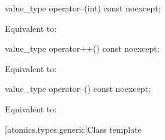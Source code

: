 %
%
\begin{itemdecl}
value_type operator--(int) const noexcept;
\end{itemdecl}

\begin{itemdescr}
\pnum
\effects
Equivalent to: 
\end{itemdescr}

%
%
\begin{itemdecl}
value_type operator++() const noexcept;
\end{itemdecl}

\begin{itemdescr}
\pnum
\effects
Equivalent to: 
\end{itemdescr}

%
%
\begin{itemdecl}
value_type operator--() const noexcept;
\end{itemdecl}

\begin{itemdescr}
\pnum
\effects
Equivalent to: 
\end{itemdescr}

[atomics.types.generic]{Class template }


